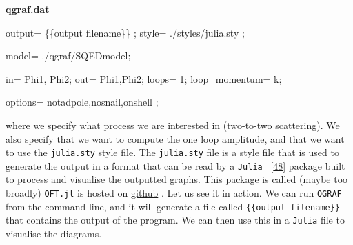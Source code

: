 \documentclass[
  10pt,
  a4paper,
  DIV=11,
  numbers=noendperiod,
  oneside]{scrreprt}
\newenvironment{Shaded}{\begin{snugshade}}{\end{snugshade}}
\newcommand{\NormalTok}[1]{\textcolor[rgb]{0.00,0.23,0.31}{#1}}
\DeclareRobustCommand{\[}{\begin{equation}}
\DeclareRobustCommand{\]}{\end{equation}}
\begin{document}
\textbf{qgraf.dat}

\begin{Shaded}
\begin{Highlighting}[]
\NormalTok{output= \textquotesingle{}\{\{output filename\}\}\textquotesingle{} ;}
\NormalTok{style= \textquotesingle{}./styles/julia.sty\textquotesingle{} ; }

\NormalTok{model= \textquotesingle{}./qgraf/SQEDmodel\textquotesingle{};}

\NormalTok{in= Phi1,  Phi2;}
\NormalTok{out= Phi1,Phi2;}
\NormalTok{loops= 1;}
\NormalTok{loop\_momentum= k;}

\NormalTok{options=  notadpole,nosnail,onshell ;}
\end{Highlighting}
\end{Shaded}

where we specify what process we are interested in (two-to-two
scattering). We also specify that we want to compute the one loop
amplitude, and that we want to use the \texttt{julia.sty} style file.
The \texttt{julia.sty} file is a style file that is used to generate the
output in a format that can be read by a \texttt{Julia}
~{[}\protect\hyperlink{ref-Bezanson:2015}{48}{]} package built to
process and visualise the outputted graphs. This package is called
(maybe too broadly) \texttt{QFT.jl} is hosted on
\href{https://github.com/lcnhb/QFT.jl}{github} . Let us see it in
action. We can run \texttt{QGRAF} from the command line, and it will
generate a file called \texttt{\{\{output\ filename\}\}} that contains
the output of the program. We can then use this in a \texttt{Julia} file
to visualise the diagrams.
\end{document}
